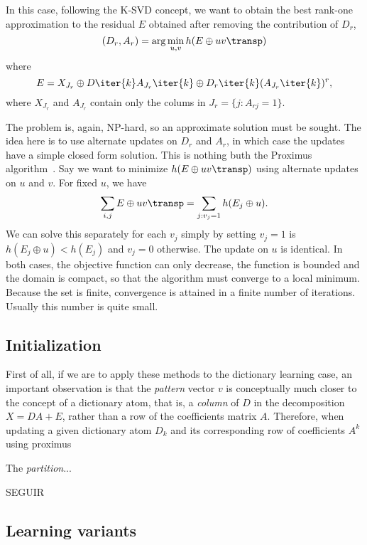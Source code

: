 \documentclass[a4paper]{IEEEtran}
\begin{document}
In this case, following the K-SVD concept, we want to obtain the best rank-one approximation to the residual $E$ obtained after removing the contribution of $D_r$, 
\begin{equation}
(D_r,A_r) = \arg\min_{u,v} h(E \oplus uv\transp)
\label{eq:bsvd1}
\end{equation}
where
\begin{equation}
E =  X_{J_r} \oplus D\iter{k}A_{J_r}\iter{k} \oplus D_r\iter{k}(A_{J_r}\iter{k})^r,
\label{eq:bsvd2}
\end{equation}
where $X_{J_r}$ and $A_{J_r}$ contain only the colums in $J_r = \{j: A_{rj} = 1 \}$.

The problem   is, again, NP-hard, so an approximate solution must be sought. The idea here is to use alternate updates on $D_r$ and $A_r$, in which case the updates have a simple closed form solution. This is nothing buth the Proximus algorithm~\cite{proximus}. Say we want to minimize $h(E \oplus uv\transp)$ using alternate updates on $u$ and $v$. For fixed $u$, we have
$$
\sum_{i,j} E \oplus uv\transp = \sum_{j: v_j = 1} h(E_j \oplus u).
$$
We can solve this separately for each $v_j$ simply by setting $v_j = 1$ is $h(E_j \oplus u) < h(E_j)$ and $v_j=0$ otherwise. The update on $u$ is identical. In both cases, the objective function can only decrease, the function is bounded and the domain is compact, so that the algorithm must converge to a local minimum. Because the set is finite, convergence is attained in a finite number of iterations. Usually this number is quite small.

\subsection{Initialization}

First of all, if we are to apply these methods to the dictionary learning case, an important observation is that the \emph{pattern} vector $v$ is conceptually much closer to the concept of a dictionary atom, that is, a \emph{column} of $D$ in the decomposition $X=DA+E$, rather than a row of the coefficients matrix $A$. Therefore, when updating a given dictionary atom $D_k$ and its corresponding row of coefficients $A^k$ using proximus

The \emph{partition}...

SEGUIR


\subsection{Learning variants}
\end{document}
